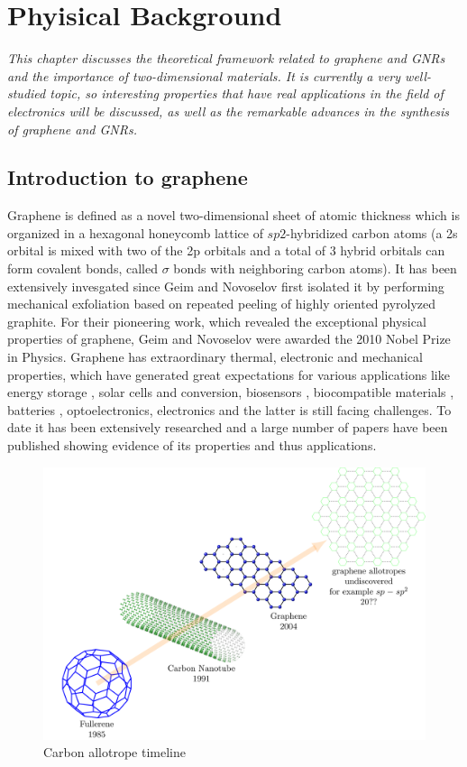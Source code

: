 \begin{center}
	
\end{center}\chapter{Phyisical Background }
\label{Phyisical Background}
\textit{This chapter discusses the theoretical framework related to graphene and GNRs and the importance of two-dimensional materials. It is currently a very well-studied topic, so interesting properties that have real applications in the field of electronics will be discussed, as well as the remarkable advances in the synthesis of graphene and GNRs.
}
\vfill
\minitoc\newpage

\section{Introduction to graphene}
\vspace{-1cm}
Graphene is defined as a novel two-dimensional sheet of atomic thickness which is organized in a hexagonal honeycomb lattice of $sp2$-hybridized carbon atoms (a 2s orbital is mixed with two of the 2p orbitals and a total of 3 hybrid orbitals can form covalent bonds, called $\sigma$ bonds with neighboring carbon atoms).  It has been extensively invesgated since Geim and Novoselov first isolated it by performing mechanical exfoliation based on repeated peeling of highly oriented pyrolyzed graphite. For their pioneering work, which revealed the exceptional physical properties of graphene, Geim and Novoselov were awarded the 2010 Nobel Prize in Physics. 
Graphene has extraordinary thermal, electronic and mechanical properties, which have generated great expectations for various applications like  energy storage , solar cells \cite{singh2015graphene} and conversion, biosensors \cite{yang2015graphene,shao2010graphene}, biocompatible materials \cite{pinto2013graphene}, batteries \cite{kucinskis2013graphene}, optoelectronics, electronics \cite{schwierz2010graphene,chee2016flexible,li2012review} and the latter is still facing challenges\cite{mullen2017polyphenylenes}.  To date it has been extensively researched and a large number of papers have been published showing evidence of its properties and thus applications. 
\begin{figure}
	\centering
	\includegraphics[width=0.8\linewidth]{FIGURES/Introduction/Intro_Fig3/Intro_Fig3}
	\caption{Carbon allotrope timeline}
	\label{fig:introfig32}
\end{figure}
